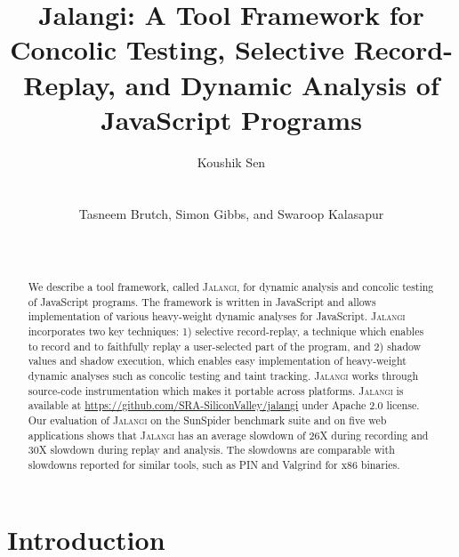 \documentclass{sig-alternate}
\def\jalangi{\textsc{Jalangi}}
\begin{document}

\title{Jalangi: A Tool Framework for Concolic Testing, Selective
  Record-Replay, and Dynamic Analysis of JavaScript Programs}

\author{
\alignauthor
Koushik Sen\\
      \\
      \\
\alignauthor
Tasneem Brutch,  Simon Gibbs, and  Swaroop Kalasapur\\
\\
\\
}
\maketitle
\sloppy

\begin{abstract}
  We describe a tool framework, called \jalangi{}, for dynamic
  analysis and concolic testing of JavaScript programs.  The framework
  is written in JavaScript and allows implementation of various
  heavy-weight dynamic analyses for JavaScript. \jalangi{}
  incorporates two key techniques: 1) selective record-replay, a
  technique which enables to record and to faithfully replay a
  user-selected part of the program, and 2) shadow values and shadow
  execution, which enables easy implementation of heavy-weight dynamic
  analyses such as concolic testing and taint tracking.  \jalangi{}
  works through source-code instrumentation which makes it portable
  across platforms.  \jalangi{} is available at
  \url{https://github.com/SRA-SiliconValley/jalangi} under Apache 2.0
  license.  Our evaluation of \jalangi{} on the SunSpider benchmark
  suite and on five web applications shows that \jalangi{} has an
  average slowdown of 26X during recording and 30X slowdown during
  replay and analysis.  The slowdowns are comparable with slowdowns
  reported for similar tools, such as PIN and Valgrind for x86
  binaries.
\end{abstract}

\section{Introduction}
\end{document}
